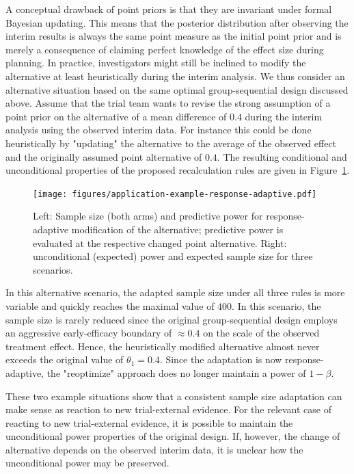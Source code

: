 \documentclass[12pt]{article}
\begin{document}
A conceptual drawback of point priors is that they are invariant under
formal Bayesian updating.
This means that the posterior distribution after observing the interim results
is always the same point measure as the initial point prior
and is merely a consequence of claiming perfect knowledge of the effect size during planning.
In practice,
investigators might still be inclined to modify the alternative at least heuristically during the interim analysis.
We thus consider an alternative situation based on the same optimal group-sequential design discussed above.
Assume that the trial team wants to revise the strong assumption of a point prior on the alternative of a mean difference of $0.4$ during the interim analysis using the observed interim data.
For instance this could be done heuristically by "updating" the alternative to the average of the observed effect and the originally assumed point alternative of $0.4$.
The resulting conditional and unconditional properties of the proposed recalculation rules are given in Figure~\ref{fig:application-examplel-response-adaptive}.
\begin{figure}
    \centering
    \texttt{[image: figures/application-example-response-adaptive.pdf]}
    \caption{%
        Left: Sample size (both arms) and predictive power for response-adaptive modification of the alternative; predictive power is evaluated at the respective changed point alternative.
        Right: unconditional (expected) power and expected sample size for three scenarios.
    }
    \label{fig:application-examplel-response-adaptive}
\end{figure}
In this alternative scenario, the adapted sample size under all three rules is more variable and quickly reaches the maximal value of $400$.
In this scenario, the sample size is rarely reduced since the original group-sequential design employs an aggressive early-efficacy boundary of $\approx 0.4$ on the scale of the observed treatment effect.
Hence, the heuristically modified alternative almost never exceeds the original value of $\theta_1 = 0.4$.
Since the adaptation is now response-adaptive, the "reoptimize" approach does no longer maintain a power of $1-\beta$.

These two example situations show that a consistent sample size adaptation can make sense as reaction to new trial-external evidence.
For the relevant case of reacting to new trial-external evidence,
it is possible to maintain the unconditional power properties of the original design.
If, however, the change of alternative depends on the observed interim data,
it is unclear how the unconditional power may be preserved.
\end{document}
